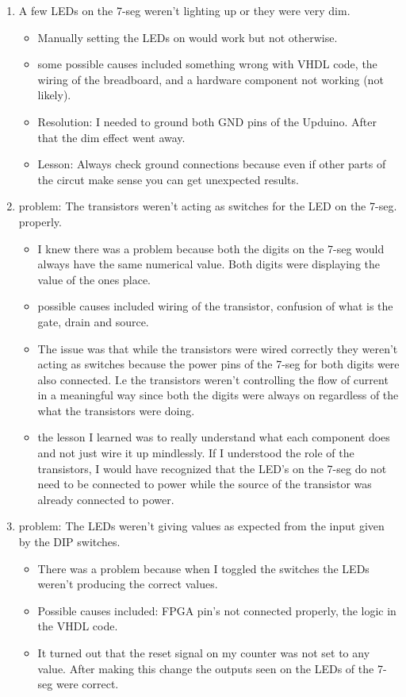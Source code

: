 \documentclass[12pt]{article}
\begin{document}
\begin{flushleft}
\begin{enumerate}
    \item A few LEDs on the 7-seg weren't lighting up or they were very dim.
    \begin{itemize} 
        \item Manually setting the LEDs on would work but not otherwise. 
        \item some possible causes included something wrong with VHDL code, the
wiring of the breadboard, and a hardware component not working (not likely). 
        \item Resolution: I needed to ground both GND pins of the Upduino. After
that the dim effect went away. 
        \item Lesson: Always check ground connections because even if other
parts of the circut make sense you can get unexpected results. 
    \end{itemize}
    \item problem: The transistors weren't acting as switches for the LED on the
7-seg. properly. 
    \begin{itemize}
        \item I knew there was a problem because both the digits on the 7-seg
would always have the same numerical value. Both digits were displaying the
value of the ones place. 
        \item possible causes included wiring of the transistor, confusion of
what is the gate, drain and source. 
        \item The issue was that while the transistors were wired correctly they
weren't acting as switches because the power pins of the 7-seg for both digits
were also connected. I.e the transistors weren't controlling the flow of current
in a meaningful way since both the digits were always on regardless of the what
the transistors were doing. 
        \item the lesson I learned was to really understand what each component
does and not just wire it up mindlessly. If I understood the role of the
transistors, I would have recognized that the LED's on the 7-seg do not need to
be connected to power while the source of the transistor was already connected
to power. 
    \end{itemize}
    \item problem: The LEDs weren't giving values as expected from the input
given by the DIP switches. 
        \begin{itemize}
            \item There was a problem because when I toggled the switches the
LEDs weren't producing the correct values. 
            \item Possible causes included: FPGA pin's not connected properly,
the logic in the VHDL code. 
            \item It turned out that the reset signal on my counter was not set
to any value. After making this change the outputs seen on the LEDs of the 7-seg
were correct. 
        \end{itemize}


\end{enumerate}
\end{flushleft}
\end{document}

